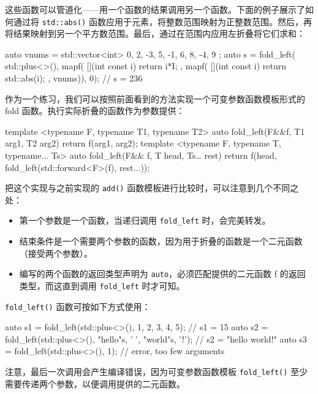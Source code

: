
这些函数可以管道化——用一个函数的结果调用另一个函数。下面的例子展示了如何通过将 \verb|std::abs()| 函数应用于元素，将整数范围映射为正整数范围。然后，再将结果映射到另一个平方数范围。最后，通过在范围内应用左折叠将它们求和：

\begin{cpp}
auto vnums = std::vector<int>{ 0, 2, -3, 5, -1, 6, 8, -4, 9 };
auto s = fold_left(
    std::plus<>(),
    mapf(
        [](int const i) {return i*I; },
        mapf(
            [](int const i) {return std::abs(i); },
            vnums)),
    0); // s = 236
\end{cpp}

作为一个练习，我们可以按照前面看到的方法实现一个可变参数函数模板形式的 fold 函数。执行实际折叠的函数作为参数提供：

\begin{cpp}
template <typename F, typename T1, typename T2>
auto fold_left(F&&f, T1 arg1, T2 arg2)
{
    return f(arg1, arg2);
}
template <typename F, typename T, typename... Ts>
auto fold_left(F&& f, T head, Ts… rest)
{
    return f(head, fold_left(std::forward<F>(f), rest...));
}
\end{cpp}

把这个实现与之前实现的 \verb|add()| 函数模板进行比较时，可以注意到几个不同之处：

\begin{itemize}
\item
第一个参数是一个函数，当递归调用 \verb|fold_left| 时，会完美转发。

\item
结束条件是一个需要两个参数的函数，因为用于折叠的函数是一个二元函数（接受两个参数）。

\item
编写的两个函数的返回类型声明为 \verb|auto|，必须匹配提供的二元函数 f 的返回类型，而这直到调用 \verb|fold_left| 时才可知。
\end{itemize}

\verb|fold_left()| 函数可按如下方式使用：

\begin{cpp}
auto s1 = fold_left(std::plus<>(), 1, 2, 3, 4, 5);
// s1 = 15
auto s2 = fold_left(std::plus<>(), "hello"s, ' ', "world"s, '!');
// s2 = "hello world!"
auto s3 = fold_left(std::plus<>(), 1); // error, too few arguments
\end{cpp}

注意，最后一次调用会产生编译错误，因为可变参数函数模板 \verb|fold_left()| 至少需要传递两个参数，以便调用提供的二元函数。


